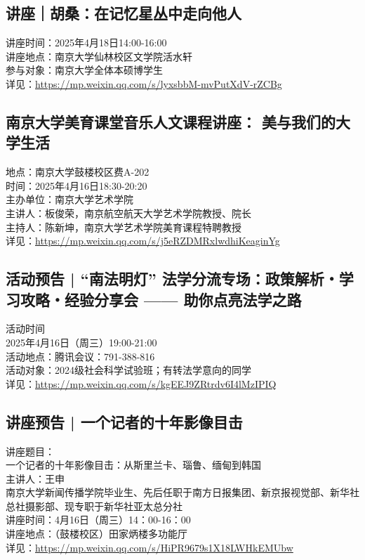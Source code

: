 \documentclass[letterpaper, 12pt]{article}
\begin{document}
\begin{multicols}{2}
\subsection{讲座｜胡桑：在记忆星丛中走向他人}
讲座时间：2025年4月18日14:00-16:00
\\讲座地点：南京大学仙林校区文学院活水轩
\\参与对象：南京大学全体本硕博学生
\\详见：\url{https://mp.weixin.qq.com/s/lyxsbbM-mvPutXdV-rZCBg}

\subsection{南京大学美育课堂音乐人文课程讲座： 美与我们的大学生活}
地点：南京大学鼓楼校区费A-202
\\时间：2025年4月16日18:30-20:20
\\主办单位：南京大学艺术学院
\\主讲人：板俊荣，南京航空航天大学艺术学院教授、院长
\\主持人：陈新坤，南京大学艺术学院美育课程特聘教授
\\详见：\url{https://mp.weixin.qq.com/s/j5eRZDMRxlwdhiKeaginYg}
\subsection{活动预告 | “南法明灯” 法学分流专场：政策解析・学习攻略・经验分享会 —— 助你点亮法学之路}
活动时间
\\2025年4月16日（周三）19:00-21:00
\\活动地点：腾讯会议：791-388-816
\\活动对象：2024级社会科学试验班；有转法学意向的同学
\\详见：\url{https://mp.weixin.qq.com/s/kgEEJ9ZRtrdv6I4lMzIPIQ}

\subsection{讲座预告 | 一个记者的十年影像目击}
讲座题目：
\\一个记者的十年影像目击：从斯里兰卡、瑙鲁、缅甸到韩国
\\主讲人：王申
\\南京大学新闻传播学院毕业生、先后任职于南方日报集团、新京报视觉部、新华社总社摄影部、现专职于新华社亚太总分社
\\讲座时间：4月16日（周三）14：00-16：00
\\讲座地点：（鼓楼校区）田家炳楼多功能厅
\\详见：\url{https://mp.weixin.qq.com/s/HiPR9679s1X18LWHkEMUbw}

\end{multicols}
\end{document}
